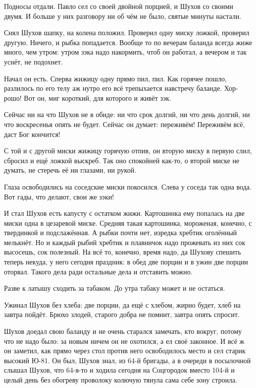 Подносы отдали. Павло сел со своей двойной порцией, и Шухов со своими двумя. И больше у них
разговору ни об чём не было, святые минуты настали.

Снял Шухов шапку, на колена положил. Проверил одну миску ложкой, проверил другую. Ничего, и
рыбка попадается. Вообще \dash то по вечерам баланда всегда жиже много, чем утром: утром зэка
надо накормить, чтоб он работал, а вечером и так уснёт, не подохнет.

Начал он есть. Сперва жижицу одну прямо пил, пил. Как горячее пошло, разлилось по его телу \dash
аж нутро его всё трепыхается навстречу баланде. Хор-рошо! Вот он, миг короткий, для которого и
живёт зэк.

Сейчас ни на что Шухов не в обиде: ни что срок долгий, ни что день долгий, ни что воскресенья
опять не будет. Сейчас он думает: переживём! Переживём всё, даст Бог кончится!

С той и с другой миски жижицу горячую отпив, он вторую миску в первую слил, сбросил и ещё
ложкой выскреб. Так оно спокойней как-то, о второй миске не думать, не стеречь её ни глазами,
ни рукой.

Глаза освободились \dash на соседские миски покосился. Слева у соседа \dash так одна вода. Вот гады,
что делают, свои же зэки!

И стал Шухов есть капусту с остатком жижи. Картошинка ему попалась на две миски одна \dash в
цезаревой миске. Средняя такая картошинка, мороженая, конечно, с твердинкой и подслажённая.
А рыбки почти нет, изредка хребтик оголённый мелькнёт. Но и каждый рыбий хребтик и плавничок
надо прожевать \dash из них сок высосешь, сок полезный. На всё то, конечно, время надо, да Шухову
спешить теперь некуда, у него сегодня праздник: в обед две порции и в ужин две порции оторвал.
Такого дела ради остальные дела и отставить можно.

Разве к латышу сходить за табаком. До утра табаку может и не остаться.

Ужинал Шухов без хлеба: две порции, да ещё с хлебом, \dash жирно будет, хлеб на завтра пойдёт.
Брюхо \dash злодей, старого добра не помнит, завтра опять спросит.

Шухов доедал свою баланду и не очень старался замечать, кто вокруг, потому что не надо было:
за новым ничем он не охотился, а ел своё законное. И всё ж он заметил, как прямо через стол
против него освободилось место и сел старик высокий Ю-81. Он был, Шухов знал, из 64-й бригады, а в
очереди в посылочной слышал Шухов, что 64-я-то и ходила сегодня на Соцгородок вместо 104-й и
целый день без обогреву проволоку колючую тянула \dash сама себе зону строила.

